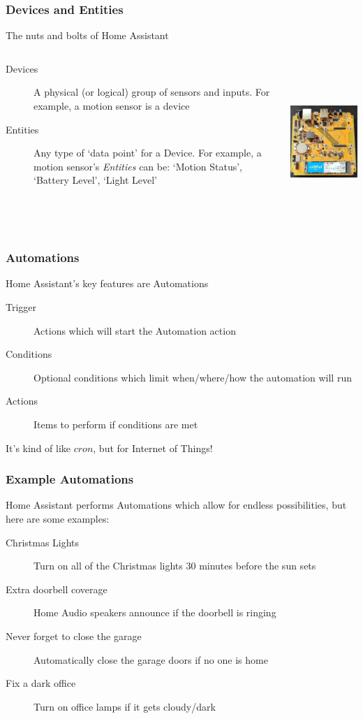 \documentclass[aspectratio=169]{beamer}
\begin{document}
\begin{frame}[fragile]
  \frametitle{Devices and Entities}
  The nuts and bolts of Home Assistant
  \vfill
  \begin{columns}[]
    \begin{column}[T]{0.45\paperwidth}
      \begin{description}%
        \item[Devices]{A physical (or logical) group of sensors and inputs. For example, a motion sensor is a device}
        \item[Entities]{Any type of `data point' for a Device. For example, a motion sensor's \emph{Entities} can be: `Motion Status', `Battery Level', `Light Level'}
      \end{description}
    \end{column}
    \begin{column}[T]{0.45\paperwidth}
      \includegraphics[height=6cm,keepaspectratio]{images/yellow.jpg}
    \end{column}
  \end{columns}
\end{frame}
\begin{frame}[fragile]
  \frametitle{Automations}
  Home Assistant's key features are Automations
  \vfill
  \begin{description}%
    \item[Trigger]{Actions which will start the Automation action}
    \item[Conditions]{Optional conditions which limit when/where/how the automation will run}
    \item[Actions]{Items to perform if conditions are met}
  \end{description}
  \vfill
  It's kind of like $cron$, but for Internet of Things!
\end{frame}
\begin{frame}[fragile]
  \frametitle{Example Automations}
  Home Assistant performs Automations which allow for endless possibilities, but here are some examples:
  \vfill
  \begin{description}%
    \item[Christmas Lights]{Turn on all of the Christmas lights 30 minutes before the sun sets}
    \item[Extra doorbell coverage]{Home Audio speakers announce if the doorbell is ringing}
    \item[Never forget to close the garage]{Automatically close the garage doors if no one is home}
    \item[Fix a dark office]{Turn on office lamps if it gets cloudy/dark}
  \end{description}
\end{frame}
\end{document}
